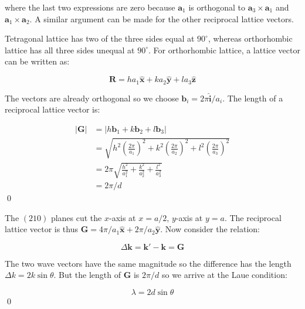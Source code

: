 \documentclass[12pt]{article}
\begin{document}
where the last two expressions are zero because $\mathbf{a}_{1}$ is orthogonal to $\mathbf{a}_{3} \times \mathbf{a}_{1}$ and $\mathbf{a}_{1} \times \mathbf{a}_{2}$. A similar argument can be made for the other reciprocal lattice vectors.

Tetragonal lattice has two of the three sides equal at $90^{\circ}$, whereas orthorhombic lattice has all three sides unequal at $90^{\circ}$. For orthorhombic lattice, a lattice vector can be written as:

\begin{equation}
    \mathbf{R} = ha_{1} \hat{\mathbf{x}} + ka_{2} \hat{\mathbf{y}} + la_{3} \hat{\mathbf{z}}
\end{equation}

The vectors are already orthogonal so we choose $\mathbf{b}_{i} = 2\pi \hat{\mathbf{i}} / a_{i}$. The length of a reciprocal lattice vector is:

\begin{equation}
    \begin{split}
        \left\lvert \mathbf{G} \right\rvert &= \left\lvert h \mathbf{b}_{1} + k \mathbf{b}_{2} + l \mathbf{b}_{3} \right\rvert \\
        &= \sqrt{h^{2} \left( \frac{2\pi}{a_{1}} \right)^{2} + k^{2} \left( \frac{2\pi}{a_{2}} \right)^{2} + l^{2} \left( \frac{2\pi}{a_{3}} \right)^{2}} \\
        &= 2\pi \sqrt{\frac{h^{2}}{a_{1}^{2}} + \frac{k^{2}}{a_{2}^{2}} + \frac{l^{2}}{a_{3}^{2}}} \\
        &= 2\pi/d
    \end{split}
\end{equation}
\qed


The $(210)$ planes cut the $x$-axis at $x = a/2$, $y$-axis at $y = a$. The reciprocal lattice vector is thus $\mathbf{G} = 4\pi/a_{1} \hat{\mathbf{x}} + 2\pi/a_{2} \hat{\mathbf{y}}$. Now consider the relation:

\begin{equation}
    \Delta \mathbf{k} = \mathbf{k}' - \mathbf{k} = \mathbf{G}
\end{equation}

The two wave vectors have the same magnitude so the difference has the length $\Delta k = 2k \sin{\theta}$. But the length of $\mathbf{G}$ is $2\pi / d$ so we arrive at the Laue condition:

\begin{equation}
    \lambda = 2d \sin{\theta}
\end{equation}
\qed
\end{document}
